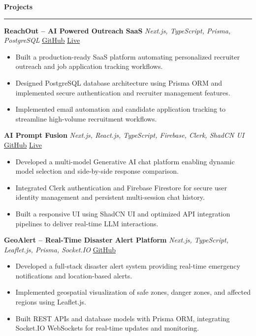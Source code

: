 \documentclass[10pt,a4paper]{article}
\newcommand{\cvsection}[1]{%
  \vspace{5pt}%
  {\large\bfseries #1}%
  \vspace{2pt}\hrule\vspace{4pt}%
}
\begin{document}
\cvsection{Projects}

\textbf{ReachOut -- AI Powered Outreach SaaS} \;\textbar\; \textit{Next.js, TypeScript, Prisma, PostgreSQL} \hfill \href{https://github.com/Varad163/ReachOut}{GitHub} \;\textbar\; \href{https://varad163-reachoutai.vercel.app/}{Live}
\begin{itemize}[label=--, noitemsep, topsep=2pt, parsep=0pt, partopsep=0pt, leftmargin=1.2em]
    \item Built a production-ready SaaS platform automating personalized recruiter outreach and job application tracking workflows.
    \item Designed PostgreSQL database architecture using Prisma ORM and implemented secure authentication and recruiter management features.
    \item Implemented email automation and candidate application tracking to streamline high-volume recruitment workflows.
\end{itemize}

\vspace{3pt}

\textbf{AI Prompt Fusion} \;\textbar\; \textit{Next.js, React.js, TypeScript, Firebase, Clerk, ShadCN UI} \hfill \href{https://github.com/Varad163/Ai-PromptFusion}{GitHub} \;\textbar\; \href{https://ai-prompt-fusion.vercel.app/}{Live}
\begin{itemize}[label=--, noitemsep, topsep=2pt, parsep=0pt, partopsep=0pt, leftmargin=1.2em]
    \item Developed a multi-model Generative AI chat platform enabling dynamic model selection and side-by-side response comparison.
    \item Integrated Clerk authentication and Firebase Firestore for secure user identity management and persistent multi-session chat history.
    \item Built a responsive UI using ShadCN UI and optimized API integration pipelines to deliver real-time LLM interactions.
\end{itemize}

\vspace{3pt}

\textbf{GeoAlert -- Real-Time Disaster Alert Platform} \;\textbar\; \textit{Next.js, TypeScript, Leaflet.js, Prisma, Socket.IO} \hfill \href{https://github.com/Varad163/GeoAlert}{GitHub}
\begin{itemize}[label=--, noitemsep, topsep=2pt, parsep=0pt, partopsep=0pt, leftmargin=1.2em]
    \item Developed a full-stack disaster alert system providing real-time emergency notifications and location-based alerts.
    \item Implemented geospatial visualization of safe zones, danger zones, and affected regions using Leaflet.js.
    \item Built REST APIs and database models with Prisma ORM, integrating Socket.IO WebSockets for real-time updates and monitoring.
\end{itemize}
\end{document}
